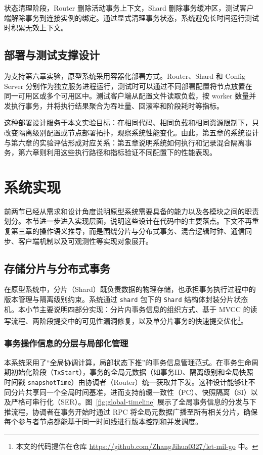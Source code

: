 状态清理阶段，Router 删除活动事务上下文，Shard 删除事务缓冲区，测试客户端解除事务到连接实例的绑定。通过显式清理事务状态，系统避免长时间运行测试时积累无效上下文。

\subsection{部署与测试支撑设计}

为支持第六章实验，原型系统采用容器化部署方式。Router、Shard 和 Config Server 分别作为独立服务进程运行，测试时可以通过不同部署配置将节点放置在同一可用区或多个可用区中。测试客户端从配置文件读取负载，按 worker 数量并发执行事务，并将执行结果聚合为吞吐量、回滚率和阶段耗时等指标。

这种部署设计服务于本文实验目标：在相同代码、相同负载和相同资源限制下，只改变隔离级别配置或节点部署拓扑，观察系统性能变化。由此，第五章的系统设计与第六章的实验评估形成对应关系：第五章说明系统如何执行和记录混合隔离事务，第六章则利用这些执行路径和指标验证不同配置下的性能表现。

\section{系统实现}
前两节已经从需求和设计角度说明原型系统需要具备的能力以及各模块之间的职责划分。本节进一步进入实现层面，说明这些设计在代码中的主要落点。下文不再重复第三章的操作语义推导，而是围绕分片与分布式事务、混合逻辑时钟、通信同步、客户端机制以及可观测性等实现对象展开。

\subsection{存储分片与分布式事务}

在原型系统中，分片（Shard）既负责数据的物理存储，也承担事务执行过程中的版本管理与隔离级别约束。系统通过 \lstinline|shard| 包下的 \lstinline|Shard| 结构体封装分片状态机。本小节主要说明四部分实现：分片内事务信息的组织方式、基于 MVCC 的读写流程、两阶段提交中的可见性漏洞修复，以及单分片事务的快速提交优化\footnote{本文的代码提供在仓库 \url{https://github.com/ZhangJihua0327/let-mil-go} 中。}。

\subsubsection{事务操作信息的分层与局部化管理}
本系统采用了“全局协调计算，局部状态下推”的事务信息管理范式。在事务生命周期初始化阶段（\lstinline|TxStart|），事务的全局元数据（如事务ID、隔离级别和全局快照时间戳 \lstinline|snapshotTime|）由协调者（Router）统一获取并下发。这种设计能够让不同分片共享同一个全局时间基准，进而支持前缀一致性（PC）、快照隔离（SI）以及严格可串行化（SER）。图~\ref{fig:global-timeline} 展示了全局事务信息的分发与下推流程，协调者在事务开始时通过 RPC 将全局元数据广播至所有相关分片，确保每个参与者节点都能基于同一时间线进行版本控制和并发调度。


